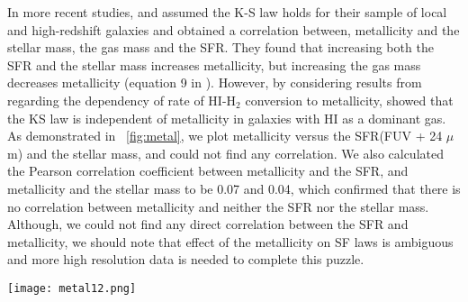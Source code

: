 \documentclass[useAMS,usenatbib]{mn2e}
\newcommand \kpc        {\,{\rm kpc}}
\begin{document}
In more recent studies, \cite{Mannucci10} and \cite{Lilly13} assumed the K-S law holds for their sample of local and high-redshift galaxies and obtained a correlation between, metallicity and the stellar mass, the gas mass and the SFR. They found that increasing both the SFR and the stellar mass increases metallicity, but increasing the gas mass decreases metallicity (equation 9 in \citep{Mannucci10}). However, by considering results from \cite{wong13} regarding the dependency of rate of HI-H$_2$ conversion to metallicity, \cite{Roychowdhury15} showed that the KS law is independent of metallicity in galaxies with HI as a dominant gas. As demonstrated in ~\ref{fig:metal}, we plot metallicity versus the SFR(FUV + 24 $\mu$m) and the stellar mass, and could not find any correlation. We also calculated the Pearson correlation coefficient between metallicity and the SFR, and metallicity and the stellar mass to be 0.07 and 0.04, which confirmed that there is no correlation between metallicity and neither the SFR  nor the stellar mass. Although, we could not find any direct correlation between the SFR and metallicity, we should note that effect of the metallicity on SF laws is ambiguous and more high resolution data is needed to complete this puzzle.

\begin{figure*}
\centering
\texttt{[image: metal12.png]}
    \caption{Right: the SFR(FUV + 24 $\mu$m) surface density versus metalicity surface density and left: Stellar mass vs metalicity surface density  shows the stellar mass. Each point shows a region with size of $\sim$750~pc. The regions with $R< 8\kpc$, $8\kpc < R < 18\kpc$, and $18\kpc < R \la 25\kpc$ are shown in red, green and blue, respectively.}
    \label{fig:metal}
\end{figure*}

\end{document}

